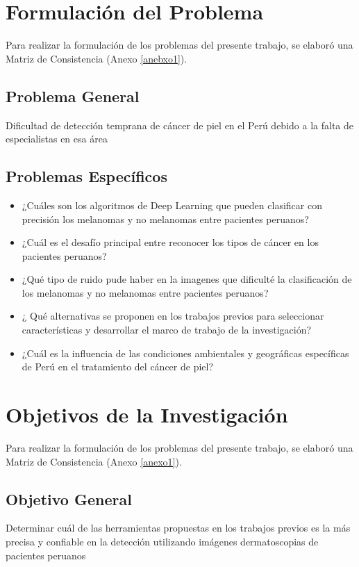 \section{Formulación del Problema}

Para realizar la formulación de los problemas del presente trabajo, se elaboró una  Matriz de Consistencia (Anexo \ref{anebxo1}).

\subsection{Problema General}
\newcommand{\ProblemaGeneral}{ Dificultad de detección temprana de cáncer de piel en el Perú debido a la falta de especialistas en esa área}
\ProblemaGeneral
\subsection{Problemas Espec\'{i}ficos}
\newcommand{\Pbone}{
¿Cuáles son los algoritmos de Deep Learning que pueden clasificar con precisión los melanomas y no melanomas entre pacientes peruanos?
}
\newcommand{\Pbtwo}{
¿Cuál es el desafío principal entre reconocer los tipos de cáncer en los pacientes peruanos?
}
\newcommand{\Pbthree}{
¿Qué tipo de ruido pude haber en la imagenes que dificulté la clasificación de los melanomas y no melanomas entre pacientes peruanos?
}
\newcommand{\Pbfour}{
¿ Qué alternativas se proponen en los trabajos previos para seleccionar características y desarrollar el marco de trabajo de la investigación?
}
\newcommand{\Pbfive}{
¿Cuál es la influencia de las condiciones ambientales y geográficas específicas de Perú en el tratamiento del cáncer de piel?
}

\begin{itemize}
	\item \Pbone
	\item \Pbtwo
	\item \Pbthree
	\item \Pbfour
	\item \Pbfive
\end{itemize}

\section{Objetivos de la Investigación}

Para realizar la formulación de los problemas del presente trabajo, se elaboró una  Matriz de Consistencia (Anexo \ref{anexo1}).


\subsection{Objetivo General}
\newcommand{\ObjetivoGeneral}{
Determinar cuál de las herramientas propuestas en los trabajos previos es la más precisa y confiable en la detección utilizando imágenes dermatoscopias de pacientes peruanos

}
\ObjetivoGeneral
